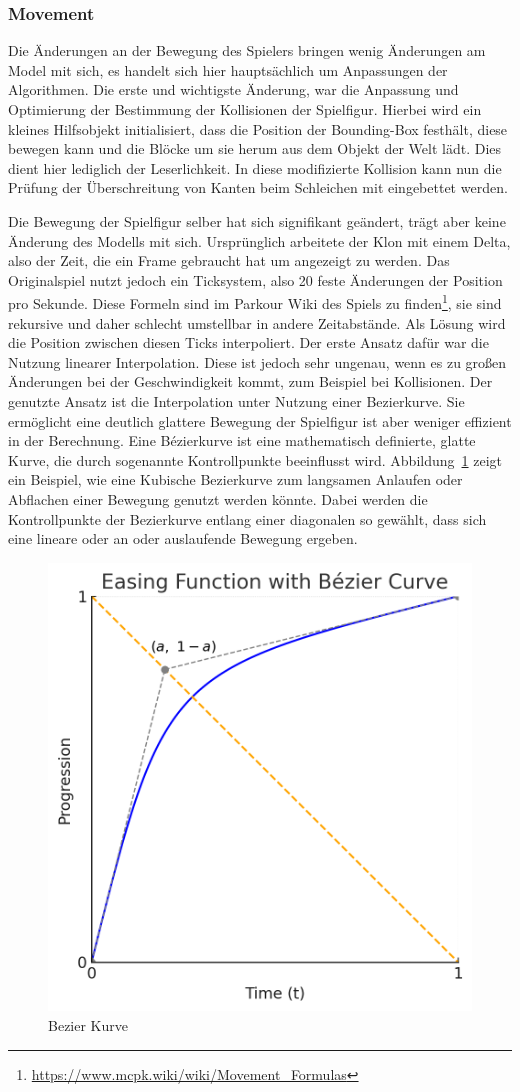 \documentclass{article}
\begin{document}
\subsubsection{Movement}


Die Änderungen an der Bewegung des Spielers bringen wenig Änderungen am Model mit sich, es handelt sich hier hauptsächlich um Anpassungen der Algorithmen. Die erste und wichtigste Änderung, war die Anpassung und Optimierung der Bestimmung der Kollisionen der Spielfigur. Hierbei wird ein kleines Hilfsobjekt initialisiert, dass die Position der Bounding-Box festhält, diese bewegen kann und die Blöcke um sie herum aus dem Objekt der Welt lädt. Dies dient hier lediglich der Leserlichkeit. In diese modifizierte Kollision kann nun die Prüfung der Überschreitung von Kanten beim Schleichen mit eingebettet werden. 

Die Bewegung der Spielfigur selber hat sich signifikant geändert, trägt aber keine Änderung des Modells mit sich. Ursprünglich arbeitete der Klon mit einem Delta, also der Zeit, die ein Frame gebraucht hat um angezeigt zu werden. Das Originalspiel nutzt jedoch ein Ticksystem, also 20 feste Änderungen der Position pro Sekunde. Diese Formeln sind im Parkour Wiki des Spiels zu finden\footnote{\url{https://www.mcpk.wiki/wiki/Movement_Formulas}}, sie sind rekursive und daher schlecht umstellbar in andere Zeitabstände. Als Lösung wird die Position zwischen diesen Ticks interpoliert. Der erste Ansatz dafür war die Nutzung linearer Interpolation. Diese ist jedoch sehr ungenau, wenn es zu großen Änderungen bei der Geschwindigkeit kommt, zum Beispiel bei Kollisionen. Der genutzte Ansatz ist die Interpolation unter Nutzung einer Bezierkurve. Sie ermöglicht eine deutlich glattere Bewegung der Spielfigur ist aber weniger effizient in der Berechnung. Eine Bézierkurve ist eine mathematisch definierte, glatte Kurve, die durch sogenannte Kontrollpunkte beeinflusst wird. Abbildung~\ref{pic:bezier} zeigt ein Beispiel, wie eine Kubische Bezierkurve zum langsamen Anlaufen oder Abflachen einer Bewegung genutzt werden könnte. Dabei werden die Kontrollpunkte der Bezierkurve entlang einer diagonalen so gewählt, dass sich eine lineare oder an oder auslaufende Bewegung ergeben.

\begin{figure} [ht]
  \centering
  \includegraphics[width=.5\linewidth]{bezier.png}
  \caption{Bezier Kurve}
  \label{pic:bezier}
\end{figure}
\end{document}
